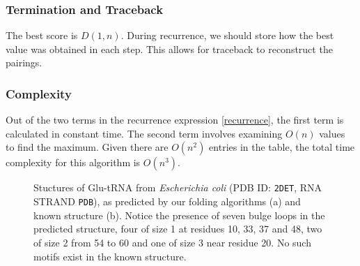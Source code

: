 \documentclass[journal]{IEEEtran}
\begin{document}
\subsubsection{ Termination and Traceback}

The best score is $D(1,n)$. During recurrence, we should store how the best value was obtained in each step. This allows for traceback to reconstruct the pairings.

\subsubsection{Complexity}

    Out of the two terms in the recurrence expression \ref{recurrence}, the first term is calculated in constant time. The second term involves examining $O(n)$ values to find the maximum. Given there are $O(n^2)$ entries in the table, the total time complexity for this algorithm is $O(n^3)$.  


\begin{figure}[t]
\centering
{}
\hfil
{}
\caption{Stuctures of Glu-tRNA from \textit{Escherichia coli} (PDB ID: \texttt{2DET}, RNA STRAND \texttt{PDB}), as predicted by our folding algorithms (a) and known structure (b). Notice the presence of seven bulge loops in the predicted structure, four of size 1 at residues 10, 33, 37 and 48, two of size 2 from 54 to 60 and one of size 3 near residue 20. No such motifs exist in the known structure.}
\label{structures}
\end{figure}
\end{document}
